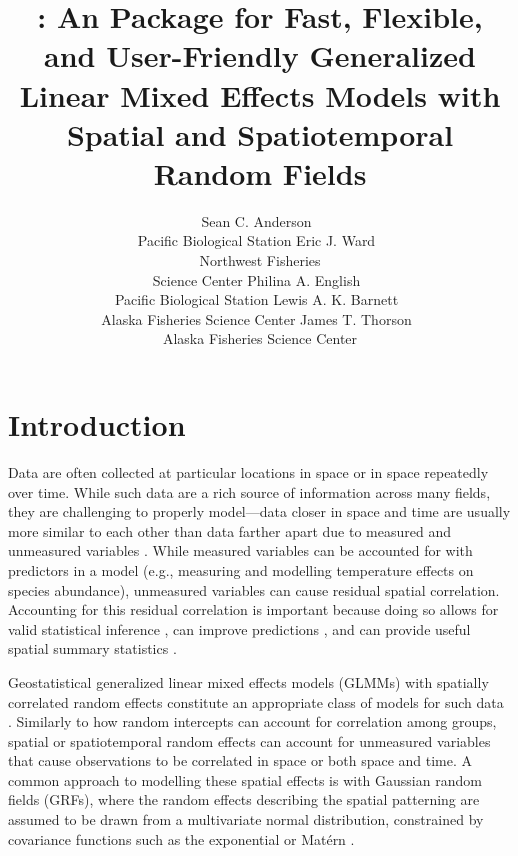 \documentclass[article]{jss}\usepackage[]{graphicx}\usepackage[dvipsnames]{xcolor}
\author{
Sean C. Anderson~\orcidlink{0000-0001-9563-1937}\\Pacific Biological
Station \And
Eric J. Ward~\orcidlink{0000-0002-4359-0296}\\Northwest
Fisheries\\Science Center \And
Philina A. English~\orcidlink{0000-0003-2992-6782}\\Pacific Biological
Station \AND
Lewis A. K. Barnett~\orcidlink{0000-0002-9381-8375}\\Alaska
Fisheries Science Center \And
James T. Thorson~\orcidlink{0000-0001-7415-1010}\\Alaska
Fisheries Science Center\\
}
\title{\pkg{sdmTMB}: An \proglang{R} Package for Fast, Flexible, and
User-Friendly Generalized Linear Mixed Effects Models with Spatial and
Spatiotemporal Random Fields}
\begin{document}
\clearpage

\section{Introduction}\label{introduction}

Data are often collected at particular locations in space or in space repeatedly over time.
While such data are a rich source of information across many fields,
they are challenging to properly model---data closer in space and time are usually more similar to each other than data farther apart due to measured and unmeasured variables \citep{cressie1993, diggle2007, cressie2011}.
While measured variables can be accounted for with predictors in a model (e.g., measuring and modelling temperature effects on species abundance), unmeasured variables can cause residual spatial correlation.
Accounting for this residual correlation is important because doing so allows for valid statistical inference \citep{legendre1989a, dormann2007}, can improve predictions \citep[e.g.,][]{shelton2014}, and can provide useful spatial summary statistics \citep[e.g.,][]{thorson2019d, barnett2021}.

Geostatistical generalized linear mixed effects models (GLMMs) with spatially correlated random effects constitute an appropriate class of models for such data \citep{rue2005gmrf, diggle2007, cressie2011, thorsonkristensen2024}.
Similarly to how random intercepts can account for correlation among groups, spatial or spatiotemporal random effects can account for unmeasured variables that cause observations to be correlated in space or both space and time.
A common approach to modelling these spatial effects is with Gaussian random fields (GRFs), where the random effects describing the spatial patterning are assumed to be drawn from a multivariate normal distribution, constrained by covariance functions such as the exponential or Matérn \citep{cressie1993, chiles1999, diggle2007}.
\end{document}
